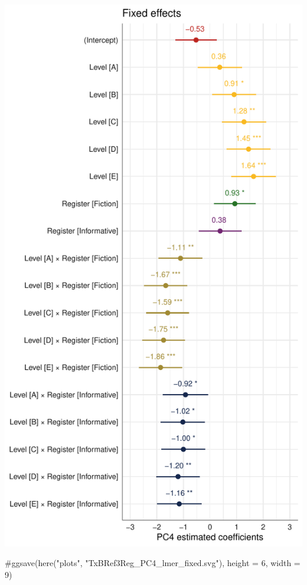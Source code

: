 \documentclass[
  letterpaper,
  DIV=11,
  numbers=noendperiod]{scrreprt}
\newenvironment{Shaded}{\begin{snugshade}}{\end{snugshade}}
\newcommand{\CommentTok}[1]{\textcolor[rgb]{0.37,0.37,0.37}{#1}}
\begin{document}
\includegraphics{G_Ch7_Analysis_files/figure-pdf/Dim4fixed-1.pdf}

\begin{Shaded}
\begin{Highlighting}[]
\CommentTok{\#ggsave(here("plots", "TxBRef3Reg\_PC4\_lmer\_fixed.svg"), height = 6, width = 9)}
\end{Highlighting}
\end{Shaded}
\end{document}
